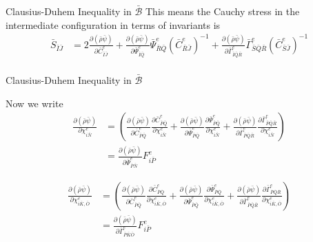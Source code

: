 \documentclass[11pt]{beamer}
\begin{document}
\begin{frame}{Clausius-Duhem Inequality in $\bar{\mathcal{B}}$}
This means the Cauchy stress in the intermediate configuration in terms of invariants is
\begin{align*}
\bar{S}_{\bar{I}\bar{J}} &= 2\frac{\partial\left(\bar{\rho}\bar{\psi}\right)}{\partial \bar{C}_{\bar{I}\bar{J}}^e} + \frac{\partial\left(\bar{\rho}\bar{\psi}\right)}{\partial \bar{\Psi}_{\bar{I}\bar{Q}}^e}\bar{\Psi}_{\bar{R}\bar{Q}}^e \left(\bar{C}_{\bar{R}\bar{J}}^e\right)^{-1} + \frac{\partial\left(\bar{\rho}\bar{\psi}\right)}{\partial \bar{\Gamma}_{\bar{I}\bar{Q}\bar{R}}^e} \bar{\Gamma}_{\bar{S}\bar{Q}\bar{R}}^e \left(\bar{C}_{\bar{S}\bar{J}}^e\right)^{-1}\\
\end{align*}

\end{frame}

\begin{frame}{Clausius-Duhem Inequality in $\bar{\mathcal{B}}$}

Now we write
\begin{align*}
\frac{\partial \left(\bar{\rho} \bar{\psi}\right)}{\partial \chi_{i\bar{N}}^e} &= \left(\frac{\partial\left(\bar{\rho}\bar{\psi}\right)}{\partial \bar{C}_{\bar{P}\bar{Q}}^e} \frac{\partial \bar{C}_{\bar{P}\bar{Q}}^e}{\partial \chi_{i\bar{N}}^e} + \frac{ \partial \left(\bar{\rho}\bar{\psi}\right)}{\partial \bar{\Psi}_{\bar{P}\bar{Q}}^e} \frac{\partial \bar{\Psi}_{\bar{P}\bar{Q}}^e}{\partial \chi_{i\bar{N}}^e} + \frac{\partial \left(\bar{\rho}\bar{\psi}\right)}{\partial \bar{\Gamma}_{\bar{P}\bar{Q}\bar{R}}^e} \frac{\partial \bar{\Gamma}_{\bar{P}\bar{Q}\bar{R}}^e}{\partial \chi_{i\bar{N}}^e}\right)\\
&= \frac{ \partial \left(\bar{\rho}\bar{\psi}\right)}{\partial \bar{\Psi}_{\bar{P}\bar{N}}^e} F_{i\bar{P}}^e
\end{align*}

\begin{align*}
\frac{\partial \left(\bar{\rho} \bar{\psi}\right)}{\partial \chi_{i\bar{K},\bar{O}}^e} &= \left(\frac{\partial\left(\bar{\rho}\bar{\psi}\right)}{\partial \bar{C}_{\bar{P}\bar{Q}}^e} \frac{\partial \bar{C}_{\bar{P}\bar{Q}}^e}{\partial \chi_{i\bar{K},\bar{O}}^e} + \frac{ \partial \left(\bar{\rho}\bar{\psi}\right)}{\partial \bar{\Psi}_{\bar{P}\bar{Q}}^e} \frac{\partial \bar{\Psi}_{\bar{P}\bar{Q}}^e}{\partial \chi_{i\bar{K},\bar{O}}^e} + \frac{\partial \left(\bar{\rho}\bar{\psi}\right)}{\partial \bar{\Gamma}_{\bar{P}\bar{Q}\bar{R}}^e} \frac{\partial \bar{\Gamma}_{\bar{P}\bar{Q}\bar{R}}^e}{\partial \chi_{i\bar{K},\bar{O}}^e}\right)\\
&= \frac{\partial \left(\bar{\rho}\bar{\psi}\right)}{\partial \bar{\Gamma}_{\bar{P}\bar{K}\bar{O}}^e} F_{i\bar{P}}^e
\end{align*}

\end{frame}
\end{document}
